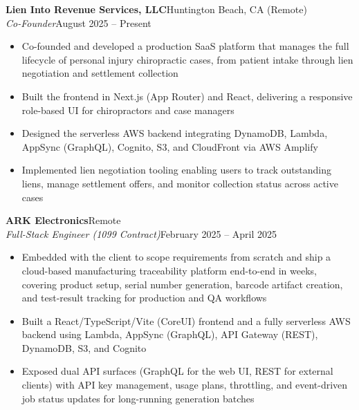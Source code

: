\documentclass[10.5pt, letterpaper]{article}
\newcommand{\jobentry}[4]{%
  \noindent
  \textbf{\color{accent}#1}\hfill\textcolor{muted}{\small #2}\\
  \textit{#3}\hfill\textcolor{muted}{\small #4}%
}
\begin{document}
\jobentry{Lien Into Revenue Services, LLC}{Huntington Beach, CA (Remote)}{Co-Founder}{August 2025 -- Present}
\begin{itemize}
  \item Co-founded and developed a production SaaS platform that manages the full
        lifecycle of personal injury chiropractic cases, from patient intake through
        lien negotiation and settlement collection
  \item Built the frontend in Next.js (App Router) and React, delivering a responsive
        role-based UI for chiropractors and case managers
  \item Designed the serverless AWS backend integrating DynamoDB, Lambda, AppSync
        (GraphQL), Cognito, S3, and CloudFront via AWS Amplify
  \item Implemented lien negotiation tooling enabling users to track outstanding liens,
        manage settlement offers, and monitor collection status across active cases
\end{itemize}

\vspace{5pt}

\jobentry{ARK Electronics}{Remote}{Full-Stack Engineer \normalfont\small(1099 Contract)}{February 2025 -- April 2025}
\begin{itemize}
  \item Embedded with the client to scope requirements from scratch and ship a
        cloud-based manufacturing traceability platform end-to-end in weeks, covering
        product setup, serial number generation, barcode artifact creation, and
        test-result tracking for production and QA workflows
  \item Built a React/TypeScript/Vite (CoreUI) frontend and a fully serverless AWS
        backend using Lambda, AppSync (GraphQL), API Gateway (REST), DynamoDB,
        S3, and Cognito
  \item Exposed dual API surfaces (GraphQL for the web UI, REST for external clients)
        with API key management, usage plans, throttling, and event-driven job status
        updates for long-running generation batches
\end{itemize}

\vspace{5pt}
\end{document}
